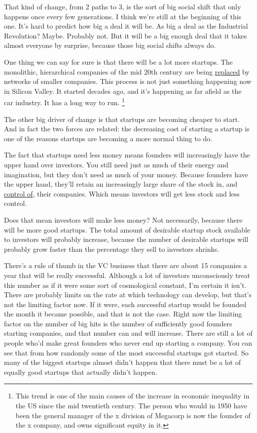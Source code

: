 \documentclass[12pt]{book}
\begin{document}
That kind of change, from 2 paths to 3, is the sort of big social shift
that only happens once every few generations. I think we're still at the
beginning of this one. It's hard to predict how big a deal it will be.
As big a deal as the Industrial Revolution? Maybe. Probably not. But it
will be a big enough deal that it takes almost everyone by surprise,
because those big social shifts always do.

One thing we can say for sure is that there will be a lot more startups.
The monolithic, hierarchical companies of the mid 20th century are being
\href{highres.html}{replaced} by networks of smaller companies. This
process is not just something happening now in Silicon Valley. It
started decades ago, and it's happening as far afield as the car
industry. It has a long way to run. \footnote{This trend is one of the main causes of the increase in economic
inequality in the US since the mid twentieth century. The person who
would in 1950 have been the general manager of the x division of
Megacorp is now the founder of the x company, and owns significant
equity in it.}

The other big driver of change is that startups are becoming cheaper to
start. And in fact the two forces are related: the decreasing cost of
starting a startup is one of the reasons startups are becoming a more
normal thing to do.

The fact that startups need less money means founders will increasingly
have the upper hand over investors. You still need just as much of their
energy and imagination, but they don't need as much of your money.
Because founders have the upper hand, they'll retain an increasingly
large share of the stock in, and \href{control.html}{control of}, their
companies. Which means investors will get less stock and less control.

Does that mean investors will make less money? Not necessarily, because
there will be more good startups. The total amount of desirable startup
stock available to investors will probably increase, because the number
of desirable startups will probably grow faster than the percentage they
sell to investors shrinks.

There's a rule of thumb in the VC business that there are about 15
companies a year that will be really successful. Although a lot of
investors unconsciously treat this number as if it were some sort of
cosmological constant, I'm certain it isn't. There are probably limits
on the rate at which technology can develop, but that's not the limiting
factor now. If it were, each successful startup would be founded the
month it became possible, and that is not the case. Right now the
limiting factor on the number of big hits is the number of sufficiently
good founders starting companies, and that number can and will increase.
There are still a lot of people who'd make great founders who never end
up starting a company. You can see that from how randomly some of the
most successful startups got started. So many of the biggest startups
almost didn't happen that there must be a lot of equally good startups
that actually didn't happen.
\end{document}
